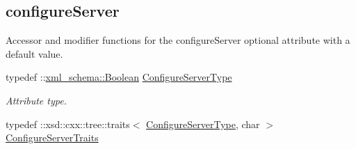 \subsection*{configureServer}
\label{_amgrp2edad505b6fc3c78a1460aa8bba3ce68}
Accessor and modifier functions for the configureServer optional attribute with a default value. \begin{DoxyCompactItemize}
\item 
\hypertarget{classopenstack_1_1xml_1_1ShareIp_af9b6ca81de82217c6f2d6cc93182b81c}{
typedef ::\hyperlink{namespacexml__schema_a2749f4f861e3517d559bb221b03e6b5b}{xml\_\-schema::Boolean} \hyperlink{classopenstack_1_1xml_1_1ShareIp_af9b6ca81de82217c6f2d6cc93182b81c}{ConfigureServerType}}
\label{classopenstack_1_1xml_1_1ShareIp_af9b6ca81de82217c6f2d6cc93182b81c}

\begin{DoxyCompactList}\small\item\em Attribute type. \item\end{DoxyCompactList}\item 
\hypertarget{classopenstack_1_1xml_1_1ShareIp_ae6e8be5896b62f3552a8dea9a866645e}{
typedef ::xsd::cxx::tree::traits$<$ \hyperlink{classopenstack_1_1xml_1_1ShareIp_af9b6ca81de82217c6f2d6cc93182b81c}{ConfigureServerType}, char $>$ \hyperlink{classopenstack_1_1xml_1_1ShareIp_ae6e8be5896b62f3552a8dea9a866645e}{ConfigureServerTraits}}
\label{classopenstack_1_1xml_1_1ShareIp_ae6e8be5896b62f3552a8dea9a866645e}


\end{DoxyCompactItemize}
